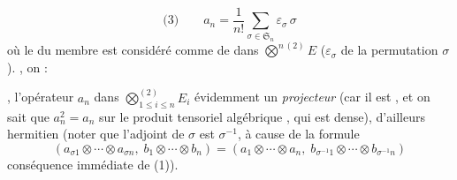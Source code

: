 \documentclass[11pt,a4paper]{article}
\begin{document}
\[
  \text{(3)}\qquad a_n = \frac{1}{n!} \sum_{\sigma \in \mathfrak{S}_n} \varepsilon_\sigma\, \sigma
\]
 où le \ill{} du  membre est considéré comme \ill{}  de  dans $\bigotimes^{n\,(2)} E$  ($\varepsilon_\sigma$  de la permutation $\sigma$). \struck{\ill{}}  , on  \ill{} :

, l'opérateur $a_n$    dans $\bigotimes^{(2)}_{1 \leq i \leq n} E_i$ \struck{\ill{}}  évidemment un \emph{projecteur}  (car il est , et on sait que \struck{\ill{}} $a_n^{2} = a_n$ sur le  produit tensoriel algébrique , qui est dense), d'ailleurs hermitien (noter que l'adjoint de $\sigma$ est $\sigma^{-1}$, à cause de la formule
\[
  (a_{\sigma 1} \otimes \cdots \otimes a_{\sigma n},\; b_1 \otimes \cdots \otimes b_n) = (a_1 \otimes \cdots \otimes a_n,\; b_{\sigma^{-1} 1} \otimes \cdots \otimes b_{\sigma^{-1} n})
\]
conséquence immédiate de (1)). \struck{\ill{}}
\end{document}
